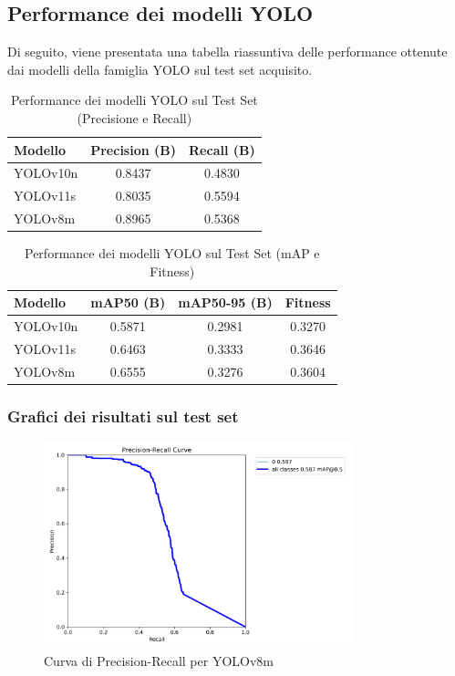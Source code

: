\documentclass[12pt]{article}
\begin{document}
\subsection{Performance dei modelli YOLO}
Di seguito, viene presentata una tabella riassuntiva delle performance ottenute dai modelli della famiglia YOLO sul test set acquisito.

\begin{table}[h!]
\centering
\label{tab:yolo_pr_performance}
\begin{tabular}{|l|c|c|}
\hline
\textbf{Modello} & \textbf{Precision (B)} & \textbf{Recall (B)} \\
\hline
YOLOv10n         & 0.8437                 & 0.4830              \\
YOLOv11s         & 0.8035                 & 0.5594              \\
YOLOv8m          & 0.8965                 & 0.5368              \\
\hline
\end{tabular}
\caption{Performance dei modelli YOLO sul Test Set (Precisione e Recall)}
\end{table}

\begin{table}[h!]
\centering
\label{tab:yolo_map_performance}
\begin{tabular}{|l|c|c|c|}
\hline
\textbf{Modello} & \textbf{mAP50 (B)} & \textbf{mAP50-95 (B)} & \textbf{Fitness} \\
\hline
YOLOv10n         & 0.5871             & 0.2981                & 0.3270           \\
YOLOv11s         & 0.6463             & 0.3333                & 0.3646           \\
YOLOv8m          & 0.6555             & 0.3276                & 0.3604           \\
\hline
\end{tabular}
\caption{Performance dei modelli YOLO sul Test Set (mAP e Fitness)}
\end{table}

\subsubsection{Grafici dei risultati sul test set}
\begin{figure}[H]
    \centering
    \includegraphics[width=0.8\textwidth]{./img/PR_curve-yolov8m.png}
    \caption{Curva di Precision-Recall per YOLOv8m}
    \label{fig:yolov8m-pr-curve}
\end{figure}
\end{document}
